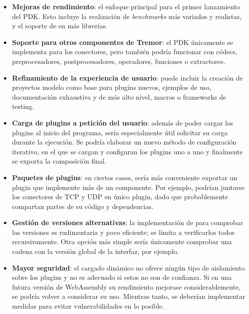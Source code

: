 \begin{itemize}
    \item \textbf{Mejoras de rendimiento}: el enfoque principal para el primer
        lanzamiento del PDK. Esto incluye la realización de \emph{benchmarks}
        más variados y realistas, y el soporte de \abistable en más librerías.

    \item \textbf{Soporte para otros componentes de Tremor}: el PDK únicamente
        se implementa para los conectores, pero también podría funcionar con
        códecs, preprocesadores, postprocesadores, operadores, funciones o
        extractores.

    \item \textbf{Refinamiento de la experiencia de usuario}: puede incluir la
        creación de proyectos modelo como base para plugins nuevos, ejemplos de
        uso, documentación exhaustiva y de más alto nivel, macros o frameworks
        de testing.

    \item \textbf{Carga de plugins a petición del usuario}: además de poder
        cargar los plugins al inicio del programa, sería especialmente útil
        solicitar su carga durante la ejecución. Se podría elaborar un nuevo
        método de configuración iterativo, en el que se cargan y configuran los
        plugins uno a uno y finalmente se exporta la composición final.

    \item \textbf{Paquetes de plugins}: en ciertos casos, sería más conveniente
        exportar un plugin que implemente más de un componente. Por ejemplo,
        podrían juntarse los conectores de TCP y UDP en único plugin, dado que
        probablemente compartan partes de su código y dependencias.

    \item \textbf{Gestión de versiones alternativas}: la implementación de
        \abistable para comprobar las versiones es rudimentaria y poco
        eficiente; se limita a verificarlos todos recursivamente. Otra opción
        más simple sería únicamente comprobar una cadena con la versión global
        de la interfaz, por ejemplo.

    \item \textbf{Mayor seguridad}: el cargado dinámico no ofrece ningún tipo de
        aislamiento sobre los plugins y no es adecuado si estos no son de
        confianza. Si en una futura versión de WebAssembly su rendimiento
        mejorase considerablemente, se podría volver a considerar su uso.
        Mientras tanto, se deberían implementar medidas para evitar
        vulnerabilidades en lo posible.


\end{itemize}
